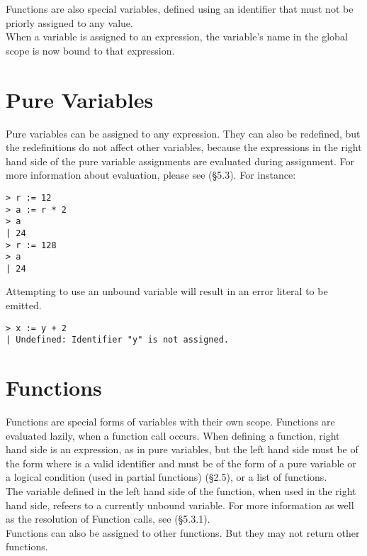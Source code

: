 \documentclass[11pt,a4paper]{book}
\begin{document}
Functions are also special variables, defined using an identifier that must not be priorly assigned to any value.\\

When a variable is assigned to an expression, the variable's name in the global scope is now bound to that expression.

\section{Pure Variables}

Pure variables can be assigned to any expression. They can also be redefined, but the redefinitions do not affect other variables, because the expressions in the right hand side of the pure variable assignments are evaluated during assignment. For more information about evaluation, please see (\S 5.3). For instance:

\begin{lstlisting}
> r := 12
> a := r * 2
> a
| 24
> r := 128
> a
| 24
\end{lstlisting}

Attempting to use an unbound variable will result in an  error literal to be emitted.

\begin{lstlisting}
> x := y + 2
| Undefined: Identifier "y" is not assigned.
\end{lstlisting}

\section{Functions}
Functions are special forms of variables with their own scope. Functions are evaluated lazily, when a function call occurs. When defining a function, right hand side is an expression, as in pure variables, but the left hand side must be of the form  where  is a valid identifier and  must be of the form of a pure variable or a logical condition (used in partial functions) (\S 2.5), or a list of functions. \\

The variable defined in the left hand side of the function, when used in the right hand side, refeers to a currently unbound variable. For more information as well as the resolution of Function calls, see (\S 5.3.1). \\

Functions can also be assigned to other functions. But they may not return other functions.
\end{document}
